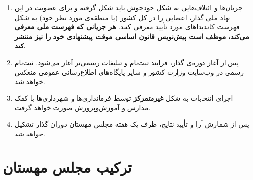 \documentclass[12pt, a4paper, openright, twoside]{book}
\begin{document}
	\begin{enumerate}[rightmargin=1em, leftmargin=0pt, itemsep=6pt,
		label=\textbf{بند \arabic*.}]
		
		\item جریان‌ها و ائتلاف‌هایی به شکل خودجوش باید شکل گرفته و برای
		عضویت در این نهاد ملی گذار، اعضایی را در کل کشور (یا منطقه‌ی
		مورد نظر خود) به شکل فهرست کاندیداهای مورد تأیید معرفی کنند.
		\textbf{هر جریانی که فهرست ملی معرفی می‌کند، موظف است پیش‌نویس
			قانون اساسی موقت پیشنهادی خود را نیز منتشر کند.}
		
		\item پس از آغاز دوره‌ی گذار، فرایند ثبت‌نام و تبلیغات رسمی‌تر آغاز
		می‌شود. ثبت‌نام رسمی در وب‌سایت وزارت کشور و سایر پایگاه‌های
		اطلاع‌رسانی عمومی منعکس خواهد شد.
		
		\item اجرای انتخابات به شکل \textbf{غیرمتمرکز} توسط فرمانداری‌ها و
		شهرداری‌ها با کمک مدارس و آموزش‌وپرورش صورت خواهد گرفت.
		
		\item پس از شمارش آرا و تأیید نتایج، ظرف یک هفته مجلس مهستان دوران
		گذار تشکیل خواهد شد.
	\end{enumerate}
	
	\section{ترکیب مجلس مهستان}
	
\end{document}
